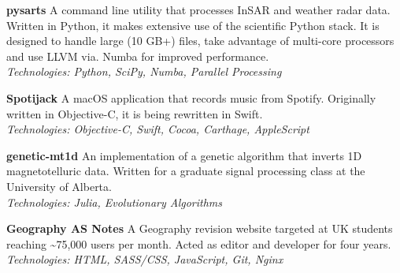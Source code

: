 %
\textbf{pysarts}  \newline
A command line utility that processes InSAR and weather radar data. Written in
Python, it makes extensive use of the scientific Python stack. It is designed to
handle large (10 GB+) files, take advantage of multi-core processors and use
LLVM via. Numba for improved performance. \\
\emph{Technologies: Python, SciPy, Numba, Parallel Processing}

\medskip
\textbf{Spotijack}  \newline
A macOS application that records music from Spotify. Originally written in
Objective-C, it is being rewritten in Swift.\\
\emph{Technologies: Objective-C, Swift, Cocoa, Carthage, AppleScript}

\medskip
\textbf{genetic-mt1d}  \newline
An implementation of a genetic algorithm that inverts 1D magnetotelluric
data. Written for a graduate signal processing class at the University of
Alberta. \\
\emph{Technologies: Julia, Evolutionary Algorithms}

\medskip
\textbf{Geography AS Notes}  \newline
A Geography revision website targeted at UK students reaching
\textasciitilde{}75,000 users per month. Acted as editor and developer for
four years. \\
\emph{Technologies: HTML, SASS/CSS, JavaScript, Git, Nginx}

\bigskip

